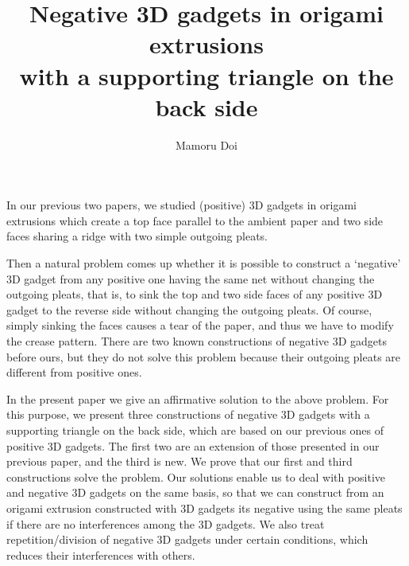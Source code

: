 \documentclass[11pt]{amsart}
\numberwithin{equation}{section}
\numberwithin{theorem}{section}
\begin{document}
\title[Negative 3D gadgets in origami extrusions with a supporting triangle on the back side]
{Negative 3D gadgets in origami extrusions\\
with a supporting triangle on the back side}
\author{Mamoru Doi}
\address{11-9-302 Yumoto-cho, Takarazuka, Hyogo 665-0003, Japan}
\maketitle
{}
In our previous two papers, we studied (positive) $3$D gadgets in origami extrusions
which create a top face parallel to the ambient paper and two side faces sharing a ridge with two simple outgoing pleats.

Then a natural problem comes up whether it is possible to construct a `negative' $3$D gadget from any positive one
having the same net without changing the outgoing pleats,
that is, to sink the top and two side faces of any positive $3$D gadget to the reverse side without changing the outgoing pleats.
Of course, simply sinking the faces causes a tear of the paper, and thus we have to modify the crease pattern.
There are two known constructions of negative $3$D gadgets before ours,
but they do not solve this problem because their outgoing pleats are different from positive ones.

In the present paper we give an affirmative solution to the above problem.
For this purpose, we present three constructions of negative $3$D gadgets with a supporting triangle on the back side,
which are based on our previous ones of positive $3$D gadgets.
The first two are an extension of those presented in our previous paper, and the third is new.
We prove that our first and third constructions solve the problem.
Our solutions enable us to deal with positive and negative $3$D gadgets on the same basis,
so that we can construct from an origami extrusion constructed with $3$D gadgets its negative using the same pleats
if there are no interferences among the $3$D gadgets.
We also treat repetition/division of negative $3$D gadgets under certain conditions, which reduces their interferences with others.
\end{document}
